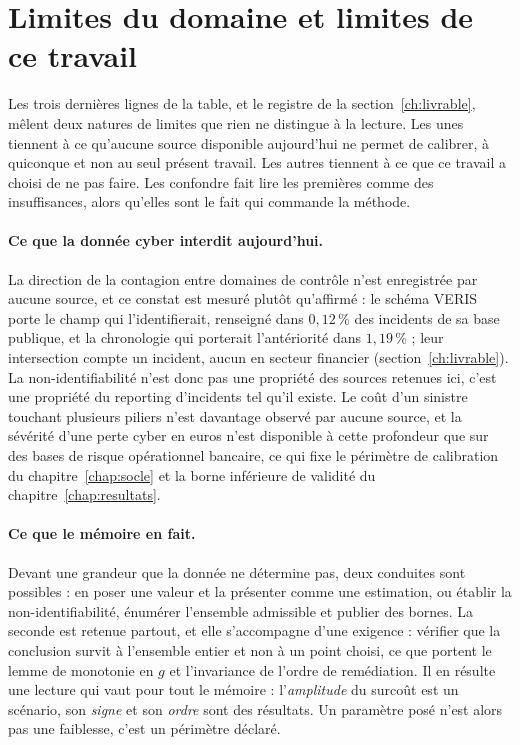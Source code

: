 

\section{Limites du domaine et limites de ce travail}


Les trois dernières lignes de la table, et le registre de la section~\ref{ch:livrable}, mêlent
deux natures de limites que rien ne distingue à la lecture. Les unes tiennent à ce qu'aucune
source disponible aujourd'hui ne permet de calibrer, à quiconque et non au seul présent travail.
Les autres tiennent à ce que ce travail a choisi de ne pas faire. Les confondre fait lire les
premières comme des insuffisances, alors qu'elles sont le fait qui commande la méthode.

\paragraph{Ce que la donnée cyber interdit aujourd'hui.} La direction de la contagion entre
domaines de contrôle n'est enregistrée par aucune source, et ce constat est mesuré plutôt
qu'affirmé : le schéma VERIS porte le champ qui l'identifierait, renseigné dans $0{,}12\,\%$ des
incidents de sa base publique, et la chronologie qui porterait l'antériorité dans $1{,}19\,\%$ ;
leur intersection compte un incident, aucun en secteur financier
(section~\ref{ch:livrable}). La non-identifiabilité n'est donc pas une propriété des sources
retenues ici, c'est une propriété du reporting d'incidents tel qu'il existe. Le coût d'un
sinistre touchant plusieurs piliers n'est davantage observé par aucune source, et la sévérité
d'une perte cyber en euros n'est disponible à cette profondeur que sur des bases de risque
opérationnel bancaire, ce qui fixe le périmètre de calibration du chapitre~\ref{chap:socle} et
la borne inférieure de validité du chapitre~\ref{chap:resultats}.

\paragraph{Ce que le mémoire en fait.} Devant une grandeur que la donnée ne détermine pas, deux
conduites sont possibles : en poser une valeur et la présenter comme une estimation, ou établir
la non-identifiabilité, énumérer l'ensemble admissible et publier des bornes. La seconde est
retenue partout, et elle s'accompagne d'une exigence : vérifier que la conclusion survit à
l'ensemble entier et non à un point choisi, ce que portent le lemme de monotonie en $g$ et
l'invariance de l'ordre de remédiation. Il en résulte une lecture qui vaut pour tout le
mémoire : l'\emph{amplitude} du surcoût est un scénario, son \emph{signe} et son \emph{ordre}
sont des résultats. Un paramètre posé n'est alors pas une faiblesse, c'est un périmètre déclaré.

